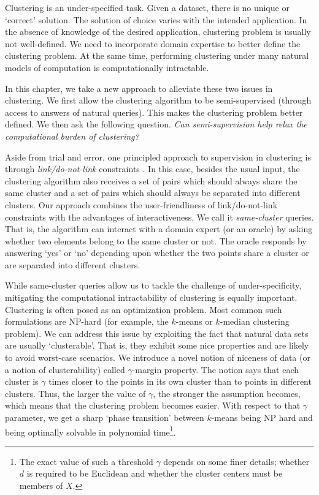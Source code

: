 \documentclass[12pt]{article}
\begin{document}
\fi

Clustering is an under-specified task. Given a dataset, there is no unique or `correct' solution. The solution of choice varies with the intended application. In the absence of knowledge of the desired application, clustering problem is usually not well-defined. We need to incorporate domain expertise to better define the clustering problem. At the same time, performing clustering under many natural models of computation is computationally intractable. 

In this chapter, we take a new approach to alleviate these two issues in clustering. We first allow the clustering algorithm to be semi-supervised (through access to answers of natural queries). This makes the clustering problem better defined. We then ask the following question. \textit{Can semi-supervision help relax the computational burden of clustering?}

Aside from trial and error, one principled approach to supervision in clustering is through \textit{link/do-not-link} constraints \cite{basu2002semi,basu2004probabilistic, kulis2009semi}. In this case, besides the usual input, the clustering algorithm also receives a set of pairs which should always share the same cluster and a set of pairs which should always be separated into different clusters. Our approach combines the user-friendliness of link/do-not-link constraints with the advantages of interactiveness. We call it \textit{same-cluster} queries.  That is, the algorithm can interact with a domain expert (or an oracle) by asking whether two elements belong to the same cluster or not. The oracle responds by answering `yes' or `no' depending upon whether the two points share a cluster or are separated into different clusters. 

While same-cluster queries allow us to tackle the challenge of under-specificity, mitigating the computational intractability of clustering is equally important. Clustering is often posed as an optimization problem. Most common such formulations are NP-hard (for example, the $k$-means or $k$-median clustering problem). We can address this issue by exploiting the fact that natural data sets are usually `clusterable'. That is, they exhibit some nice properties and are likely to avoid worst-case scenarios. We introduce a novel notion of niceness of data (or a notion of clusterability) called $\gamma$-margin property. The notion says that each cluster is $\gamma$ times closer to the points in its own cluster than to points in different clusters. Thus, the larger the value of $\gamma$, the stronger the assumption becomes, which means that the clustering problem becomes easier. With respect to that $\gamma$ parameter, we get a sharp `phase transition' between $k$-means being NP hard and being optimally solvable in polynomial time\footnote{The exact value of such a threshold $\gamma$ depends on some finer details; whether $d$ is required to be Euclidean and whether the cluster centers must be members of $X$.}.
\end{document}

